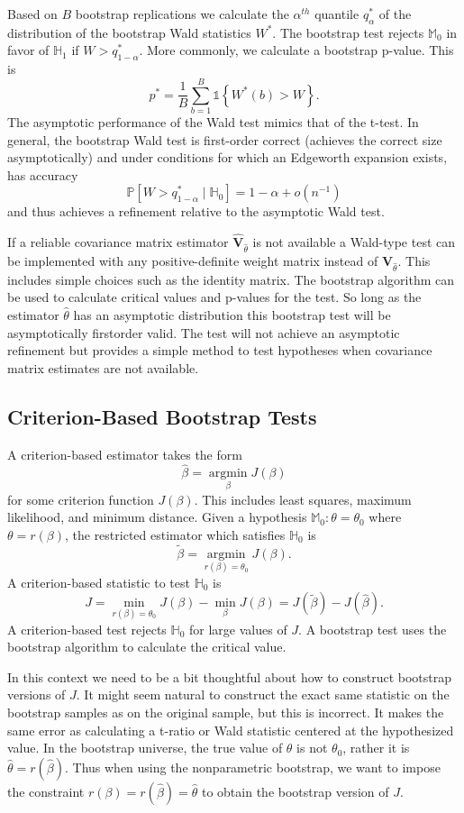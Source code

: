 \documentclass[10pt]{article}
\begin{document}
Based on $B$ bootstrap replications we calculate the $\alpha^{t h}$ quantile $q_{\alpha}^{*}$ of the distribution of the bootstrap Wald statistics $W^{*}$. The bootstrap test rejects $\mathbb{M}_{0}$ in favor of $\mathbb{H}_{1}$ if $W>q_{1-\alpha}^{*}$. More commonly, we calculate a bootstrap p-value. This is
$$
p^{*}=\frac{1}{B} \sum_{b=1}^{B} \mathbb{1}\left\{W^{*}(b)>W\right\} .
$$
The asymptotic performance of the Wald test mimics that of the t-test. In general, the bootstrap Wald test is first-order correct (achieves the correct size asymptotically) and under conditions for which an Edgeworth expansion exists, has accuracy
$$
\mathbb{P}\left[W>q_{1-\alpha}^{*} \mid \mathbb{H}_{0}\right]=1-\alpha+o\left(n^{-1}\right)
$$
and thus achieves a refinement relative to the asymptotic Wald test.

If a reliable covariance matrix estimator $\widehat{\boldsymbol{V}}_{\widehat{\theta}}$ is not available a Wald-type test can be implemented with any positive-definite weight matrix instead of $\widehat{\boldsymbol{V}}_{\widehat{\theta}}$. This includes simple choices such as the identity matrix. The bootstrap algorithm can be used to calculate critical values and $\mathrm{p}$-values for the test. So long as the estimator $\hat{\theta}$ has an asymptotic distribution this bootstrap test will be asymptotically firstorder valid. The test will not achieve an asymptotic refinement but provides a simple method to test hypotheses when covariance matrix estimates are not available.

\subsection{Criterion-Based Bootstrap Tests}
A criterion-based estimator takes the form
$$
\widehat{\beta}=\underset{\beta}{\operatorname{argmin}} J(\beta)
$$
for some criterion function $J(\beta)$. This includes least squares, maximum likelihood, and minimum distance. Given a hypothesis $\mathbb{M}_{0}: \theta=\theta_{0}$ where $\theta=r(\beta)$, the restricted estimator which satisfies $\mathbb{H}_{0}$ is
$$
\widetilde{\beta}=\underset{r(\beta)=\theta_{0}}{\operatorname{argmin}} J(\beta) .
$$
A criterion-based statistic to test $\mathbb{H}_{0}$ is
$$
J=\min _{r(\beta)=\theta_{0}} J(\beta)-\min _{\beta} J(\beta)=J(\widetilde{\beta})-J(\widehat{\beta}) .
$$
A criterion-based test rejects $\mathbb{H}_{0}$ for large values of $J$. A bootstrap test uses the bootstrap algorithm to calculate the critical value.

In this context we need to be a bit thoughtful about how to construct bootstrap versions of $J$. It might seem natural to construct the exact same statistic on the bootstrap samples as on the original sample, but this is incorrect. It makes the same error as calculating a t-ratio or Wald statistic centered at the hypothesized value. In the bootstrap universe, the true value of $\theta$ is not $\theta_{0}$, rather it is $\widehat{\theta}=r(\widehat{\beta})$. Thus when using the nonparametric bootstrap, we want to impose the constraint $r(\beta)=r(\widehat{\beta})=\widehat{\theta}$ to obtain the bootstrap version of $J$.
\end{document}
